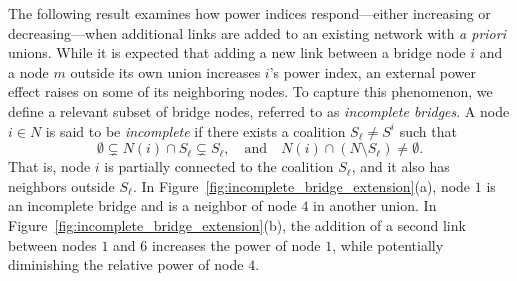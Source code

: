 \documentclass[preprint,11pt,authoryear]{elsarticle}
\theoremstyle{plain}
\begin{document}
The following result examines how power indices respond—either increasing or decreasing—when additional links are added to an existing network with \emph{a priori} unions.
While it is expected that adding a new link between a bridge node \( i \) and a node \( m \) outside its own union increases \( i \)'s power index, an external power effect raises on some of its neighboring nodes. 
To capture this phenomenon, we define a relevant subset of bridge nodes, referred to as \emph{incomplete bridges}. A node \( i \in N \) is said to be \emph{incomplete} if there exists a coalition \( S_\ell \neq S^i \) such that
\[
\emptyset \subsetneq N(i) \cap S_\ell \subsetneq S_\ell, \quad \text{and} \quad N(i) \cap (N \setminus S_\ell) \neq \emptyset.
\]
That is, node \( i \) is partially connected to the coalition \( S_\ell \), and it also has neighbors outside \( S_\ell \). 
In Figure~\ref{fig:incomplete_bridge_extension}(a), node \( 1 \) is an incomplete bridge and is a neighbor of node \( 4 \) in another union. In Figure~\ref{fig:incomplete_bridge_extension}(b), the addition of a second link between nodes \( 1 \) and \( 6 \) increases the power of node \( 1 \), while potentially diminishing the relative power of node \(4\).
\end{document}
